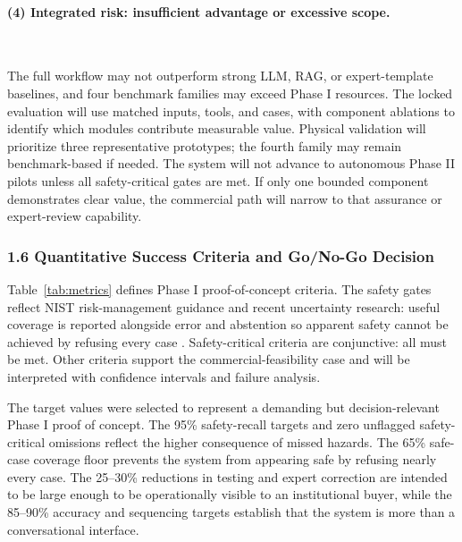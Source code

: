 \paragraph{(4) Integrated risk: insufficient advantage or excessive scope.}~{}

The full workflow may not outperform strong LLM, RAG, or expert-template
baselines, and four benchmark families may exceed Phase I resources.
The locked evaluation will use matched inputs, tools, and cases, with
component ablations to identify which modules contribute measurable
value. Physical validation will prioritize three representative
prototypes; the fourth family may remain benchmark-based if needed.
The system will not advance to autonomous Phase II pilots unless all
safety-critical gates are met. If only one bounded component demonstrates
clear value, the commercial path will narrow to that assurance or
expert-review capability.

\subsubsection*{1.6 Quantitative Success Criteria and Go/No-Go Decision}
Table~\ref{tab:metrics} defines Phase I proof-of-concept criteria. The safety gates reflect NIST risk-management guidance and recent uncertainty research: useful coverage is reported alongside error and abstention so apparent safety cannot be achieved by refusing every case \cite{nist2023airmf,nist2024genaiprofile,angelopoulos2023conformal,farquhar2024semanticentropy,xiong2024uncertainty}. Safety-critical criteria are conjunctive: all must be met. Other criteria support the commercial-feasibility case and will be interpreted with confidence intervals and failure analysis.

The target values were selected to represent a demanding but decision-relevant Phase I proof of concept. The 95\% safety-recall targets and zero unflagged safety-critical omissions reflect the higher consequence of missed hazards. The 65\% safe-case coverage floor prevents the system from appearing safe by refusing nearly every case. The 25--30\% reductions in testing and expert correction are intended to be large enough to be operationally visible to an institutional buyer, while the 85--90\% accuracy and sequencing targets establish that the system is more than a conversational interface.

